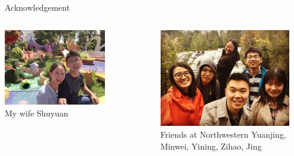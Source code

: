 \begin{frame}{Acknowledgement}

    \begin{columns}
        \centering
        \includegraphics[width=0.7\textwidth]{slides/figures/shuyuan} \\
        My wife Shuyuan
        
        
        \centering
        \includegraphics[width=0.9\textwidth]{slides/figures/friends}\\
        Friends at Northwestern Yuanjing, Minwei, Yining, Zihao, Jing
    \end{columns}
\end{frame}


